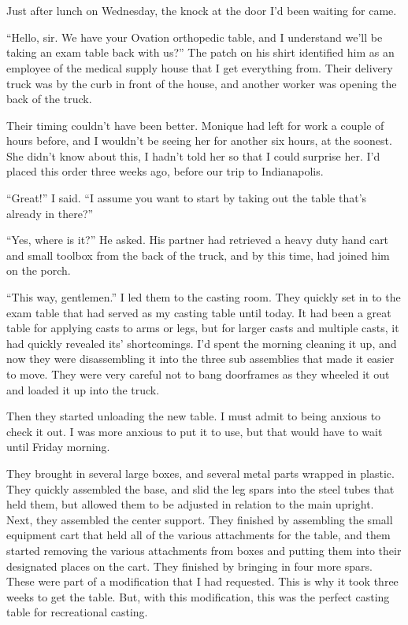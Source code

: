 \chapter{~}
Just after lunch on Wednesday, the knock at the door I'd been waiting for came.

``Hello, sir. We have your Ovation orthopedic table, and I understand we'll be taking an
exam table back with us?'' The patch on his shirt identified him as an employee of the medical
supply house that I get everything from. Their delivery truck was by the curb in front of the
house, and another worker was opening the back of the truck.

Their timing couldn't have been better. Monique had left for work a couple of hours before,
and I wouldn't be seeing her for another six hours, at the soonest. She didn't know about this,
I hadn't told her so that I could surprise her. I'd placed this order three weeks ago, before
our trip to Indianapolis.

``Great!'' I said. ``I assume you want to start by taking out the table that's already in
there?''

``Yes, where is it?'' He asked. His partner had retrieved a heavy duty hand cart and small
toolbox from the back of the truck, and by this time, had joined him on the porch.

``This way, gentlemen.'' I led them to the casting room. They quickly set in to the exam
table that had served as my casting table until today. It had been a great table for applying
casts to arms or legs, but for larger casts and multiple casts, it had quickly revealed its'
shortcomings. I'd spent the morning cleaning it up, and now they were disassembling it into the
three sub assemblies that made it easier to move. They were very careful not to bang doorframes
as they wheeled it out and loaded it up into the truck.

Then they started unloading the new table. I must admit to being anxious to check it out. I
was more anxious to put it to use, but that would have to wait until Friday morning.

They brought in several large boxes, and several metal parts wrapped in plastic. They
quickly assembled the base, and slid the leg spars into the steel tubes that held them, but
allowed them to be adjusted in relation to the main upright. Next, they assembled the center
support. They finished by assembling the small equipment cart that held all of the various
attachments for the table, and them started removing the various attachments from boxes and
putting them into their designated places on the cart. They finished by bringing in four more
spars. These were part of a modification that I had requested. This is why it took three weeks
to get the table. But, with this modification, this was the perfect casting table for
recreational casting.

